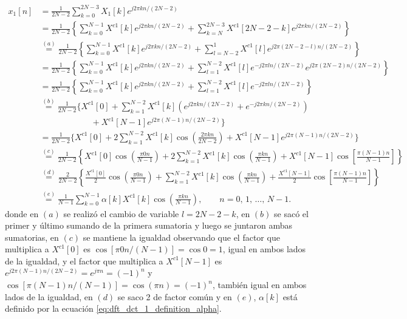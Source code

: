 \documentclass[a4paper]{report}
\begin{document}
\begin{align*}
 x_1[n]&=\frac{1}{2N-2}\sum_{k=0}^{2N-3}X_1[k]e^{j2\pi kn/(2N-2)}\\
  &=\frac{1}{2N-2}\left\{\sum_{k=0}^{N-1}X^{c1}[k]e^{j2\pi kn/(2N-2)}+\sum_{k=N}^{2N-3}X^{c1}[2N-2-k]e^{j2\pi kn/(2N-2)}\right\}\\
  &\overset{(a)}{=}\frac{1}{2N-2}\left\{\sum_{k=0}^{N-1}X^{c1}[k]e^{j2\pi kn/(2N-2)}
    +\sum_{l=N-2}^{1}X^{c1}[l]e^{j2\pi (2N-2-l)n/(2N-2)}\right\}\\
  &=\frac{1}{2N-2}\left\{\sum_{k=0}^{N-1}X^{c1}[k]e^{j2\pi kn/(2N-2)}
    +\sum_{l=1}^{N-2}X^{c1}[l]e^{-j2\pi ln/(2N-2)}e^{j2\pi(2N-2)n/(2N-2)}\right\}\\
  &=\frac{1}{2N-2}\left\{\sum_{k=0}^{N-1}X^{c1}[k]e^{j2\pi kn/(2N-2)}
    +\sum_{l=1}^{N-2}X^{c1}[l]e^{-j2\pi ln/(2N-2)}\right\}\\
  &\overset{(b)}{=}\frac{1}{2N-2}\Bigg\{X^{c1}[0]
    +\sum_{k=1}^{N-2}X^{c1}[k]\left(e^{j2\pi kn/(2N-2)}+e^{-j2\pi kn/(2N-2)}\right)\\
  &\qquad\qquad\qquad 
    +X^{c1}[N-1]e^{j2\pi (N-1)n/(2N-2)}\Bigg\}\\
  &=\frac{1}{2N-2}\Bigg\{X^{c1}[0]
    +2\sum_{k=1}^{N-2}X^{c1}[k]\cos\left(\frac{2\pi kn}{2N-2}\right)
    +X^{c1}[N-1]e^{j2\pi (N-1)n/(2N-2)}\Bigg\}\\
  &\overset{(c)}{=}\frac{1}{2N-2}\left\{X^{c1}[0]\cos\left(\frac{\pi 0n}{N-1}\right)
    +2\sum_{k=1}^{N-2}X^{c1}[k]\cos\left(\frac{\pi kn}{N-1}\right)
    +X^{c1}[N-1]\cos\left[\frac{\pi(N-1)n}{N-1}\right]\right\}\\
  &\overset{(d)}{=}\frac{2}{2N-2}\left\{\frac{X^{c1}[0]}{2}\cos\left(\frac{\pi 0n}{N-1}\right)
    +\sum_{k=1}^{N-2}X^{c1}[k]\cos\left(\frac{\pi kn}{N-1}\right)
    +\frac{X^{c1}[N-1]}{2}\cos\left[\frac{\pi(N-1)n}{N-1}\right]\right\}\\
  &\overset{(e)}{=}\frac{1}{N-1}\sum_{k=0}^{N-1}\alpha[k]X^{c1}[k]\cos\left(\frac{\pi kn}{N-1}\right),
  \qquad 
   n=0,\,1,\,\dots,\,N-1.
\end{align*}
donde en \((a)\) se realizó el cambio de variable \(l=2N-2-k\), en \((b)\) se sacó el primer y último sumando de la primera sumatoria y luego se juntaron ambas sumatorias, en \((c)\) se mantiene la igualdad observando que el factor que multiplica a \(X^{c1}[0]\) es \(\cos[\pi0n/(N-1)]=\cos0=1\), igual en ambos lados de la igualdad, y el factor que multiplica a \(X^{c1}[N-1]\) es \(e^{j2\pi (N-1)n/(2N-2)}=e^{j\pi n}=(-1)^n\) y \(\cos[\pi(N-1)n/(N-1)]=\cos(\pi n)=(-1)^n\), también igual en ambos lados de la igualdad, en \((d)\) se saco 2 de factor común y en \((e)\), \(\alpha[k]\) está definido por la ecuación \ref{eq:dft_dct_1_definition_alpha}.
\end{document}
